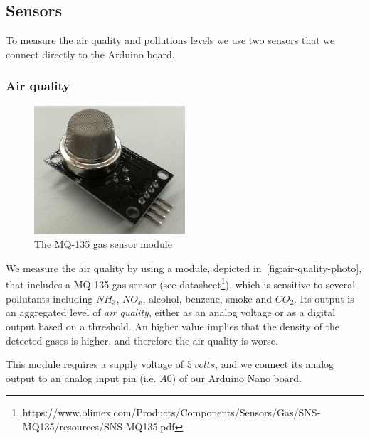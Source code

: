 \documentclass[12pt]{article}
\begin{document}
  \subsection{Sensors}
  To measure the air quality and pollutions levels we use two sensors that we connect directly to the Arduino board.
  \subsubsection{Air quality}
  \begin{figure}[H]
    \centering
    \includegraphics[width=0.5\textwidth]{images/mq-135.jpg}
    \caption{The MQ-135 gas sensor module}
    \label{fig:air-quality-photo}
  \end{figure}
  We measure the air quality by using a module, depicted in~\autoref{fig:air-quality-photo}, that includes a MQ-135 gas sensor (see datasheet\footnote{https://www.olimex.com/Products/Components/Sensors/Gas/SNS-MQ135/resources/SNS-MQ135.pdf}), which is sensitive to several pollutants including $NH_3$, $NO_x$, alcohol, benzene, smoke and $CO_2$.
  Its output is an aggregated level of \textit{air quality}, either as an analog voltage or as a digital output based on a threshold. An higher value implies that the density of the detected gases is higher, and therefore the air quality is worse.

  This module requires a supply voltage of $5\ volts$, and we connect its analog output to an analog input pin (i.e. $A0$) of our Arduino Nano board.
\end{document}
